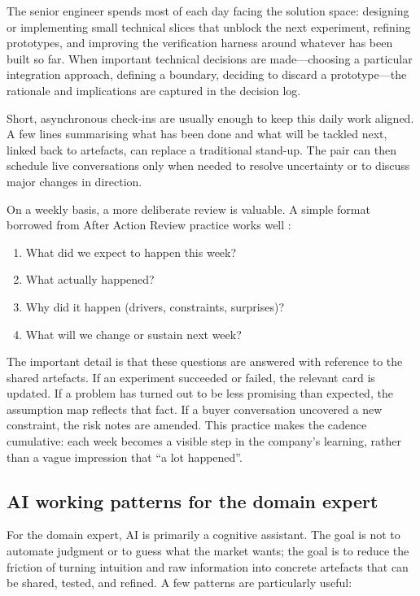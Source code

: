 \documentclass[10pt, a4paper, twocolumn]{article} %
\begin{document}
The senior engineer spends most of each day facing the solution space: designing or implementing small technical slices that unblock the next experiment, refining prototypes, and improving the verification harness around whatever has been built so far. When important technical decisions are made—choosing a particular integration approach, defining a boundary, deciding to discard a prototype—the rationale and implications are captured in the decision log.

Short, asynchronous check-ins are usually enough to keep this daily work aligned. A few lines summarising what has been done and what will be tackled next, linked back to artefacts, can replace a traditional stand-up. The pair can then schedule live conversations only when needed to resolve uncertainty or to discuss major changes in direction.

On a weekly basis, a more deliberate review is valuable. A simple format borrowed from After Action Review practice works well \citep{blomgren2025coordination,torres2021continuous}:

\begin{enumerate}
  \item What did we expect to happen this week?
  \item What actually happened?
  \item Why did it happen (drivers, constraints, surprises)?
  \item What will we change or sustain next week?
\end{enumerate}

The important detail is that these questions are answered with reference to the shared artefacts. If an experiment succeeded or failed, the relevant card is updated. If a problem has turned out to be less promising than expected, the assumption map reflects that fact. If a buyer conversation uncovered a new constraint, the risk notes are amended. This practice makes the cadence cumulative: each week becomes a visible step in the company’s learning, rather than a vague impression that “a lot happened”.

\newpage

\subsection{AI working patterns for the domain expert}

For the domain expert, AI is primarily a cognitive assistant. The goal is not to automate judgment or to guess what the market wants; the goal is to reduce the friction of turning intuition and raw information into concrete artefacts that can be shared, tested, and refined. A few patterns are particularly useful:
\end{document}
